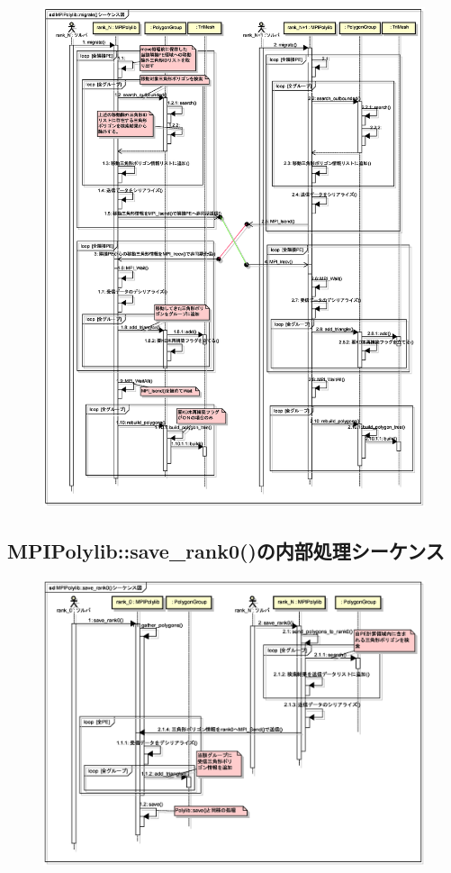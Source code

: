 {\begin{figure}[H]
 \centering
 \includegraphics[width=16cm]{clip020.eps}
\end{figure}


\pagebreak
%
\subsection{MPIPolylib::save\_rank0()の内部処理シーケンス}

\begin{figure}[H]
 \centering
 \includegraphics[width=16cm]{clip021.eps}
\end{figure}


}
